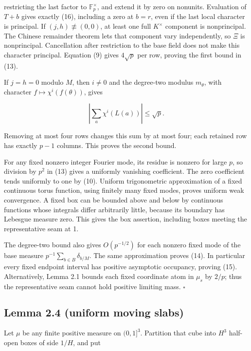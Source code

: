 \documentclass[11pt,a4paper]{article}
\begin{document}
restricting the last factor to \(\mathbb F_p^{\times}\), and extend it by zero on nonunits. Evaluation of \(T+b\) gives exactly (16), including a zero at \(b=r\), even if the last local character is principal. If \((j,h)\not\equiv(0,0)\), at least one full \(K^{\times}\) component is nonprincipal. The Chinese remainder theorem lets that component vary independently, so \(\Xi\) is nonprincipal. Cancellation after restriction to the base field does not make this character principal. Equation (9) gives \(4\sqrt p\) per row, proving the first bound in (13).

If \(j=h=0\) modulo \(M\), then \(i\ne0\) and the degree-two modulus \(m_\theta\), with character \(f\mapsto\chi^i(f(\theta))\), gives

\[\left|\sum_a\chi^i(L(a))\right|\le\sqrt p.\]

Removing at most four rows changes this sum by at most four; each retained row has exactly \(p-1\) columns. This proves the second bound.

For any fixed nonzero integer Fourier mode, its residue is nonzero for large \(p\), so division by \(p^2\) in (13) gives a uniformly vanishing coefficient. The zero coefficient tends uniformly to one by (10). Uniform trigonometric approximation of a fixed continuous torus function, using finitely many fixed modes, proves uniform weak convergence. A fixed box can be bounded above and below by continuous functions whose integrals differ arbitrarily little, because its boundary has Lebesgue measure zero. This gives the box assertion, including boxes meeting the representative seam at 1.

The degree-two bound also gives \(O(p^{-1/2})\) for each nonzero fixed mode of the base measure \(p^{-1}\sum_{b\in B}\delta_{b/M}\). The same approximation proves (14). In particular every fixed endpoint interval has positive asymptotic occupancy, proving (15). Alternatively, Lemma 2.1 bounds each fixed coordinate atom in \(\mu_s\) by \(2/p\); thus the representative seam cannot hold positive limiting mass. \hfill\(\square\)

\subsection{Lemma 2.4 (uniform moving slabs)}\label{lemma-2.4-uniform-moving-slabs}

Let \(\mu\) be any finite positive measure on \((0,1]^3\). Partition that cube into \(H^3\) half-open boxes of side \(1/H\), and put
\end{document}
